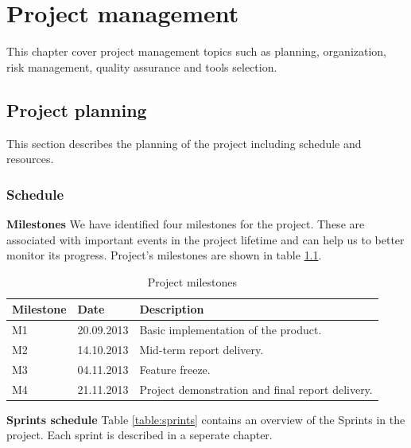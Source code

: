 \chapter{Project management}

\label{ch:management}
\nocite{Sommerville9}

This chapter cover project management topics such as planning, organization,
risk management, quality assurance and tools selection.

\section{Project planning}
\label{section:planning}
This section describes the planning of the project including schedule and resources.

\subsection{Schedule}
\label{section:schedule}

\textbf{Milestones} \newline
We have identified four milestones for the project. These are associated with important events in the project lifetime
and can help us to better monitor its progress. Project's milestones are shown in table \ref{table:milestones}.

\begin{table}[h]
\begin{center}
\begin{tabular}{ | l | l | l | }
  \hline
  Milestone & Date & Description \\
  \hline\noalign{\smallskip}\hline
  M1 & 20.09.2013 & Basic implementation of the product. \\
  M2 & 14.10.2013 & Mid-term report delivery. \\
  M3 & 04.11.2013 & Feature freeze. \\
  M4 & 21.11.2013 & Project demonstration and final report delivery. \\
  \hline
\end{tabular}
\end{center}
\caption{Project milestones}
\label{table:milestones}
\end{table}

\textbf{Sprints schedule} \newline
Table \ref{table:sprints} contains an overview of the Sprints in the project.
Each sprint is described in a seperate chapter.

